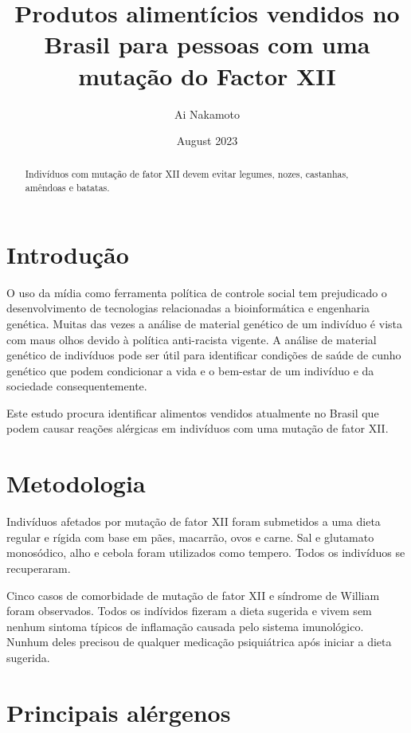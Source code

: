 \documentclass{article}
\begin{document}
\title{Produtos alimentícios vendidos no Brasil para pessoas com uma mutação do Factor XII}
\author{Ai Nakamoto}
\date{August 2023}
\maketitle

\begin{abstract}
Indivíduos com mutação de fator XII devem evitar
legumes, nozes, castanhas, amêndoas e batatas.
\end{abstract}

\section{Introdução}

O uso da mídia como ferramenta política de controle social
tem prejudicado o desenvolvimento de tecnologias relacionadas
a bioinformática e engenharia genética. Muitas das vezes
a análise de material genético de um indivíduo é vista com
maus olhos devido à política anti-racista vigente.
A análise de material genético de indivíduos pode ser útil
para identificar condições de saúde de cunho genético que
podem condicionar a vida e o bem-estar de um indivíduo e
da sociedade consequentemente.

Este estudo procura identificar alimentos vendidos atualmente
no Brasil que podem causar reações alérgicas em indivíduos com
uma mutação de fator XII.

\section{Metodologia}

Indivíduos afetados por mutação de fator XII foram submetidos a uma dieta
regular e rígida com base em pães, macarrão, ovos e carne. Sal e glutamato
monosódico, alho e cebola foram utilizados como tempero. Todos os indivíduos
se recuperaram.

Cinco casos de comorbidade de mutação de fator XII e síndrome de William
foram observados. Todos os indívidos fizeram a dieta sugerida e vivem sem
nenhum sintoma típicos de inflamação causada pelo sistema imunológico.
Nunhum deles precisou de qualquer medicação psiquiátrica após iniciar a
dieta sugerida.

\section{Principais alérgenos}
\end{document}
